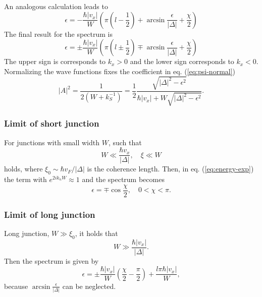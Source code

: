 An analogous calculation leads to
\begin{equation}
\epsilon = - \frac{\hbar |v_x|}{W} \left( \pi \left(l - \frac{1}{2} \right) + \arcsin \frac{\epsilon}{|\Delta|} + \frac{\chi}{2} \right)
\end{equation}
The final result for the spectrum is
\begin{equation}
\epsilon = \pm \frac{\hbar |v_x|}{W} \left( \pi \left(l \pm \frac{1}{2} \right) \mp \arcsin \frac{\epsilon}{|\Delta|} + \frac{\chi}{2} \right)
\end{equation}
The upper sign is corresponds to $k_x > 0$ and the lower sign corresponds to $k_x  <0 $.\\
Normalizing the wave functions fixes the coefficient in eq. (\ref{eq:psi-normal})
\begin{equation}
|A|^2 = \frac{1}{2(W+ k_S^{-1})} = \frac{1}{2} \frac{\sqrt{|\Delta|^2 - \epsilon^2}}{\hbar |v_x| + W \sqrt{|\Delta|^2 - \epsilon^2}}.
\end{equation}
\subsubsection*{Limit of short junction}

For junctions with small width $W$, such that 
\begin{equation}
W \ll \frac{\hbar v_x }{|\Delta|}, \quad \xi \ll W
\end{equation}
holds, where $\xi_0 \sim \hbar v_F / |\Delta|$ is the coherence length. Then, in eq. (\ref{eq:energy-exp}) the term with $e^{2i k_n W} \approx 1$ and the spectrum becomes
\begin{equation}
\epsilon = \mp \cos \frac{\chi}{2}, \quad 0 < \chi < \pi.
\end{equation}

\subsubsection*{Limit of long junction}

Long junction, $W \gg \xi_0$, it holds that 
\begin{equation}
W \gg \frac{\hbar |v_x|}{|\Delta|}.
\end{equation} 
Then the spectrum is given by
\begin{equation}
\epsilon = \pm \frac{\hbar |v_x|}{W}\left(\frac{\chi}{2} - \frac{\pi}{2} \right) + \frac{l \pi \hbar |v_x|}{W},
\end{equation}
because $\arcsin \frac{\epsilon}{|\Delta|}$ can be neglected.


